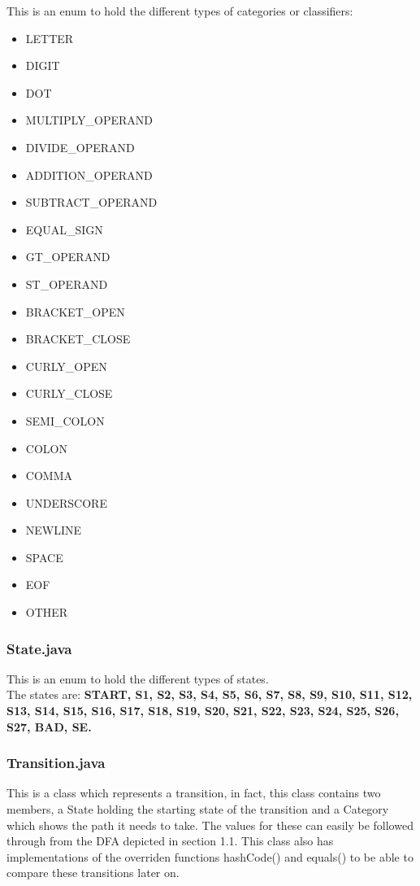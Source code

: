 \documentclass{article}
\begin{document}
					This is an enum to hold the different types of categories or classifiers:
					\begin{itemize}
						\item LETTER
						\item DIGIT
						\item DOT
			    			\item MULTIPLY\_OPERAND
			    			\item DIVIDE\_OPERAND
			    			\item ADDITION\_OPERAND
			    			\item SUBTRACT\_OPERAND
						\item EQUAL\_SIGN
			    			\item GT\_OPERAND  
						\item ST\_OPERAND
			    			\item BRACKET\_OPEN  
						\item BRACKET\_CLOSE
			    			\item CURLY\_OPEN
						\item CURLY\_CLOSE
			    			\item SEMI\_COLON
			    			\item COLON
			    			\item COMMA
			    			\item UNDERSCORE
			    			\item NEWLINE
			    			\item SPACE
			    			\item EOF
			    			\item OTHER
					\end{itemize}
					
				      \subsubsection{State.java}
					
					This is an enum to hold the different types of states.\\
					The states are: \textbf{START, S1, S2, S3, S4, S5, S6, S7, S8, S9, S10, S11, S12, S13, S14, S15, S16, S17, S18, S19, S20, S21, S22, S23, S24, S25, S26, S27, BAD, SE.}
					
					\subsubsection{Transition.java}
					
					This is a class which represents a transition, in fact, this class contains two members, a State holding the starting state of the transition and a Category which shows the path it needs to take. The values for these can easily be followed through from the DFA depicted in section 1.1. This class also has implementations of the overriden functions hashCode() and equals() to be able to compare these transitions later on.
			
\end{document}
